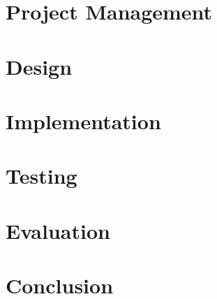 \documentclass[
  12pt,
  a4paper,
  twoside,
  onecolumn,
  appendixprefix=true,
  toc=chapterentrywithdots,
  toc=bibliography,
  abstract=true,
  toc=listof
]{scrreprt}
\begin{document}
\chapter{Project Management}
\label{project_management}


\chapter{Design}
\label{design}


\chapter{Implementation}
\label{implementation}


\chapter{Testing}
\label{testing}


\chapter{Evaluation}
\label{evaluation}


\chapter{Conclusion}
\label{conclusion}






\appendix
\newpage
{}

\end{document}
